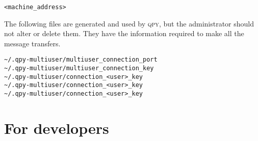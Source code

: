 \documentclass[a4paper,12pt]{article}
\newcommand{\qpy}{\textsc{qpy}}
\begin{document}
\begin{lstlisting}[style=FileStyle]
<machine_address>
\end{lstlisting}


The following files are generated and used by \qpy{}, but the administrator should not alter or delete them.
They have the information required to make all the message transfers.

\begin{verbatim}
~/.qpy-multiuser/multiuser_connection_port
~/.qpy-multiuser/multiuser_connection_key
~/.qpy-multiuser/connection_<user>_key
~/.qpy-multiuser/connection_<user>_key
~/.qpy-multiuser/connection_<user>_key
\end{verbatim}









\newpage
\section{For developers}





\linespread{0.8}
\end{document}
